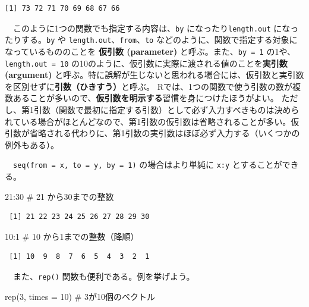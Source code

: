 \documentclass[
  a4paper,
  pandoc,
  ja=standard,
  jafont=haranoaji]{bxjsbook}
\newenvironment{Shaded}{\begin{snugshade}}{\end{snugshade}}
\newcommand{\AttributeTok}[1]{\textcolor[rgb]{0.00,0.48,0.65}{#1}}
\newcommand{\CommentTok}[1]{\textcolor[rgb]{0.37,0.37,0.37}{#1}}
\newcommand{\DecValTok}[1]{\textcolor[rgb]{0.68,0.00,0.00}{#1}}
\newcommand{\FunctionTok}[1]{\textcolor[rgb]{0.28,0.35,0.67}{#1}}
\newcommand{\NormalTok}[1]{\textcolor[rgb]{0.00,0.48,0.65}{#1}}
\newcommand{\SpecialCharTok}[1]{\textcolor[rgb]{0.37,0.37,0.37}{#1}}
\begin{document}
\begin{verbatim}
[1] 73 72 71 70 69 68 67 66
\end{verbatim}

　このように1つの関数でも指定する内容は、\texttt{by}
になったり\texttt{length.out} になったりする。\texttt{by} や
\texttt{length.out}、\texttt{from}、\texttt{to}
などのように、関数で指定する対象になっているもののことを \textbf{仮引数
(parameter)} と呼ぶ。また、\texttt{by\ =\ 1}
の1や、\texttt{length.out\ =\ 10}
の10のように、仮引数に実際に渡される値のことを\textbf{実引数 (argument)}
と呼ぶ。特に誤解が生じないと思われる場合には、仮引数と実引数を区別せずに\textbf{引数（ひきすう）}と呼ぶ。
Rでは、1つの関数で使う引数の数が複数あることが多いので、\textbf{仮引数を明示する}習慣を身につけたほうがよい。
ただし、第1引数（関数で最初に指定する引数）として必ず入力すべきものは決められている場合がほとんどなので、第1引数の仮引数は省略されることが多い。仮引数が省略される代わりに、第1引数の実引数はほぼ必ず入力する（いくつかの例外もある）。

　\texttt{seq(from\ =\ x,\ to\ =\ y,\ by\ =\ 1)} の場合はより単純に
\texttt{x:y} とすることができる。

\begin{Shaded}
\begin{Highlighting}[numbers=left,,]
\DecValTok{21}\SpecialCharTok{:}\DecValTok{30}  \CommentTok{\# 21 から30までの整数}
\end{Highlighting}
\end{Shaded}

\begin{verbatim}
 [1] 21 22 23 24 25 26 27 28 29 30
\end{verbatim}

\begin{Shaded}
\begin{Highlighting}[numbers=left,,]
\DecValTok{10}\SpecialCharTok{:}\DecValTok{1}   \CommentTok{\# 10 から1までの整数（降順）}
\end{Highlighting}
\end{Shaded}

\begin{verbatim}
 [1] 10  9  8  7  6  5  4  3  2  1
\end{verbatim}

　また、\texttt{rep()} 関数も便利である。例を挙げよう。

\begin{Shaded}
\begin{Highlighting}[numbers=left,,]
\FunctionTok{rep}\NormalTok{(}\DecValTok{3}\NormalTok{, }\AttributeTok{times =} \DecValTok{10}\NormalTok{)                         }\CommentTok{\# 3が10個のベクトル}
\end{Highlighting}
\end{Shaded}
\end{document}
